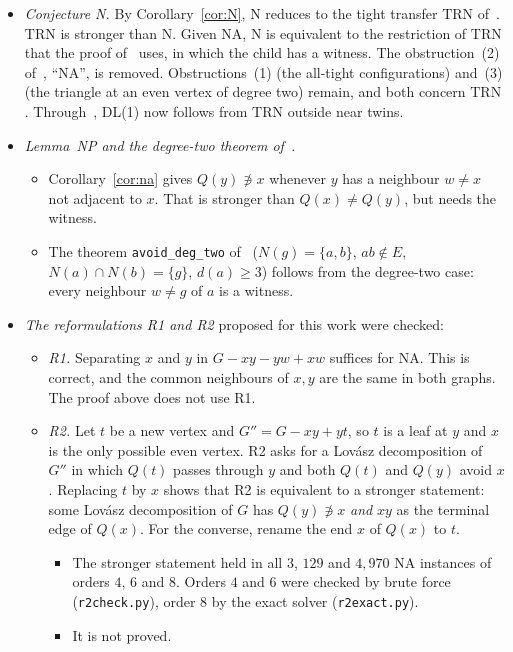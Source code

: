 \documentclass[11pt]{amsart}
\theoremstyle{definition}
\newcommand{\TRN}{\mathrm{TRN}}
\begin{document}
\begin{itemize}
\item \emph{Conjecture N.} By Corollary~\ref{cor:N}, N reduces to the tight transfer $\TRN$
of~\cite{CN}. $\TRN$ is stronger than N. Given NA, N is equivalent to the restriction of $\TRN$ that
the proof of~\cite[Thm.~4.6]{CN} uses, in which the child has a witness. The obstruction~(2) of~\cite[\S6]{CN}, ``NA'', is removed. Obstructions~(1) (the
all-tight configurations) and~(3) (the triangle at an even vertex of degree two) remain, and both
concern $\TRN$. Through~\cite[Prop.~9.2]{DL}, DL(1) now follows from $\TRN$ outside near twins.
\item \emph{Lemma~NP and the degree-two theorem of~\cite{DL}.}
  \begin{itemize}
  \item Corollary~\ref{cor:na} gives $Q(y)\not\ni x$ whenever $y$ has a neighbour $w\ne x$ not
  adjacent to $x$. That is stronger than $Q(x)\ne Q(y)$, but needs the witness.
  \item The theorem \texttt{avoid\_deg\_two} of~\cite{DL} ($N(g)=\{a,b\}$, $ab\notin E$,
  $N(a)\cap N(b)=\{g\}$, $d(a)\ge3$) follows from the degree-two case: every neighbour $w\ne g$ of $a$ is a witness.
  \end{itemize}
\item \emph{The reformulations R1 and R2} proposed for this work were checked:
  \begin{itemize}
  \item \emph{R1.} Separating $x$ and $y$ in $G-xy-yw+xw$ suffices for NA. This is correct, and the
  common neighbours of $x,y$ are the same in both graphs. The proof above does not use R1.
  \item \emph{R2.} Let $t$ be a new vertex and $G''=G-xy+yt$, so $t$ is a leaf at $y$ and $x$ is the
  only possible even vertex. R2 asks for a Lov\'asz decomposition of $G''$ in which $Q(t)$ passes
  through $y$ and both $Q(t)$ and $Q(y)$ avoid $x$. Replacing $t$ by $x$ shows that R2 is equivalent
  to a stronger statement: some Lov\'asz decomposition of $G$ has $Q(y)\not\ni x$ \emph{and} $xy$ as
  the terminal edge of $Q(x)$. For the converse, rename the end $x$ of $Q(x)$ to $t$.
    \begin{itemize}
    \item The stronger statement held in all $3$, $129$ and $4{,}970$ NA instances of orders $4$, $6$
    and $8$. Orders $4$ and $6$ were checked by brute force (\texttt{r2check.py}), order $8$ by the
    exact solver (\texttt{r2exact.py}).
    \item It is not proved.

\end{itemize}
\end{itemize}
\end{itemize}
\end{document}
